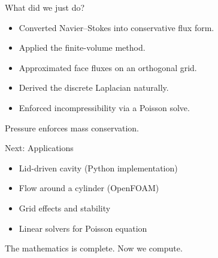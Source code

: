 \documentclass[aspectratio=169]{beamer}
\begin{document}
\begin{frame}{What did we just do?}

\begin{itemize}
\item Converted Navier–Stokes into conservative flux form.
\item Applied the finite-volume method.
\item Approximated face fluxes on an orthogonal grid.
\item Derived the discrete Laplacian naturally.
\item Enforced incompressibility via a Poisson solve.
\end{itemize}

\bigskip
\centering
\Large
Pressure enforces mass conservation.
\end{frame}


\begin{frame}{Next: Applications}

\begin{itemize}
\item Lid-driven cavity (Python implementation)
\item Flow around a cylinder (OpenFOAM)
\item Grid effects and stability
\item Linear solvers for Poisson equation
\end{itemize}

\bigskip
\centering
\Large
The mathematics is complete.  
Now we compute.
\end{frame}

\end{document}
